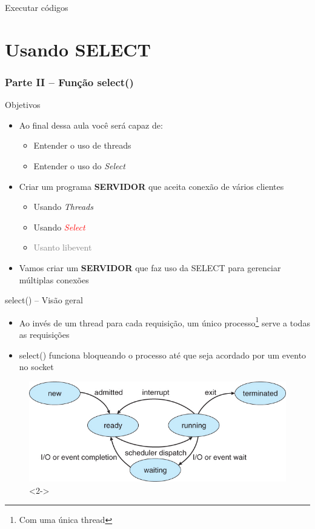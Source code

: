 \documentclass[10pt, xcolor=x11names]{beamer}
\begin{document}

\begin{frame}
	\centering
 	\Huge
	Executar códigos
\end{frame}

\section{Usando SELECT}
\begin{frame} \frametitle{Parte II -- Função select()}
	\begin{block}{Objetivos}
		\begin{itemize}
			\item Ao final dessa aula você será capaz de:
			\begin{itemize}
				\item Entender o uso de threads
				\item Entender o uso do \textit{Select}
			\end{itemize}
			\item Criar um programa \textbf{SERVIDOR} que aceita conexão de vários clientes
			\begin{itemize}
				\item Usando \textit{Threads}
				\item Usando \textcolor<2->{red}{\textit{Select}}
				\item \textcolor{gray}{Usanto libevent}
			\end{itemize}
		\end{itemize}
		\begin{itemize}
			\item<2-> Vamos criar um \textbf{SERVIDOR} que faz uso da SELECT para gerenciar múltiplas conexões
		\end{itemize}
	\end{block}
\end{frame}

\begin{frame}
	\begin{block}{select() -- Visão geral}
		\begin{itemize}
			\item<1-> Ao invés de um thread para cada requisição, um único processo\footnote{Com uma única thread} serve a todas as requisições
			\item<2-> select() funciona bloqueando o processo até que seja acordado por um evento no socket
		\end{itemize}
	\end{block}

	\begin{figure}
		\includegraphics[width=.5\linewidth]{img/process_states.png}<2->
	\end{figure}
	
\end{frame}
\end{document}
